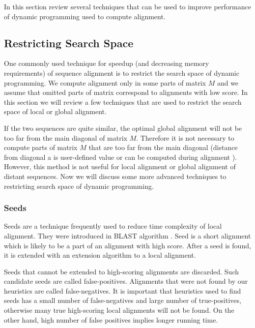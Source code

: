 
In this section review several techniques that can be used to improve
performance of dynamic programming used to compute alignment.

\subsection{Restricting Search Space}

One commonly used technique for speedup (and decreasing memory requirements) of
sequence alignment is to restrict the search space of dynamic programming. We
compute alignment only in some parts of matrix $M$ and we assume that omitted
parts of matrix correspond to alignments with low score. In this section we will
review a few techniques that are used to restrict the search space of local or
global alignment.

If the two sequences are quite similar, the optimal global alignment will not be
too far from the main diagonal of matrix $M$. Therefore it is not necessary to compute
parts of matrix $M$ that are too far from the main diagonal \cite{Chao1992} (distance from
diagonal a is
user-defined value or can be computed during alignment \cite{GusfieldBook}).
However, this method is not useful for local alignment or global alignment of 
distant sequences. Now we will discuss some more advanced techniques to
restricting search space of dynamic programming.



\subsubsection{Seeds}

Seeds are a technique frequently  used to reduce time complexity of local alignment.  They were
introduced in BLAST algorithm \cite{Altschul1990}.  Seed is a short alignment which
is likely to be a part of an alignment with high score. After a seed is
found, it is extended with an extension algorithm to a local alignment.

Seeds that cannot be extended to high-scoring alignments are
discarded. Such candidate seeds are called false-positives.
Alignments that were not found by our heuristics
are called false-negatives.
It is important that heuristics used to find seeds has a small number of
false-negatives and large number of true-positives,
otherwise many true high-scoring local alignments will not be found. On the other
hand, high number of false positives implies longer running time. 


